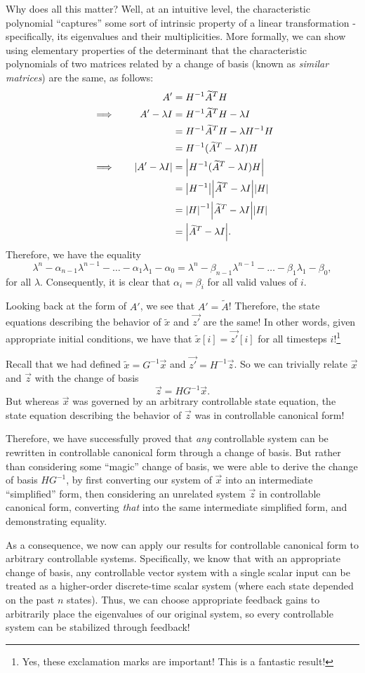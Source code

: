 \documentclass[letterpaper]{article}
\theoremstyle{remark}
\renewcommand{\tilde}[1]{\widetilde{#1}}
\newcommand{\eqn}[1]{\begin{alignat*}{2}#1\end{alignat*}}
\newcommand*{\thus}{&\implies\quad&}
\begin{document}
Why does all this matter? Well, at an intuitive level, the characteristic polynomial ``captures'' some sort of intrinsic property of a linear transformation - specifically, its eigenvalues and their multiplicities. More formally, we can show using elementary properties of the determinant that the characteristic polynomials of two matrices related by a change of basis (known as \emph{similar matrices}) are the same, as follows:
\eqn{
    && A' &= H^{-1}\tilde{A}^TH \\
    \thus A' - \lambda I &= H^{-1}\tilde{A}^TH - \lambda I \\
    &&&= H^{-1}\tilde{A}^TH - \lambda H^{-1}H \\
    &&&= H^{-1}(\tilde{A}^T - \lambda I)H \\
    \thus \abs{A' - \lambda I} &= \abs{H^{-1}(\tilde{A}^T - \lambda I)H} \\
    &&&= \abs{H^{-1}}\abs{\tilde{A}^T - \lambda I}\abs{H} \\
    &&&= \abs{H}^{-1}\abs{\tilde{A}^T - \lambda I}\abs{H} \\
    &&&= \abs{\tilde{A}^T - \lambda I}.
}
Therefore, we have the equality
\[
\lambda^n - \alpha_{n-1}\lambda^{n-1} - \ldots - \alpha_1\lambda_1 - \alpha_0 = \lambda^n - \beta_{n-1}\lambda^{n-1} - \ldots - \beta_1\lambda_1 - \beta_0,
\]
for all $\lambda$. Consequently, it is clear that $\alpha_i = \beta_i$ for all valid values of $i$.

Looking back at the form of $A'$, we see that $A' = \tilde{A}$! Therefore, the state equations describing the behavior of $\tilde{x}$ and $\vec{z'}$ are the same! In other words, given appropriate initial conditions, we have that $\tilde{x}[i] = \vec{z'}[i]$ for all timesteps $i$!\footnote{Yes, these exclamation marks are important! This is a fantastic result!}

Recall that we had defined $\tilde{x} = G^{-1}\vec{x}$ and $\vec{z'} = H^{-1}\vec{z}$. So we can trivially relate $\vec{x}$ and $\vec{z}$ with the change of basis
\[
    \vec{z} = HG^{-1}\vec{x}.
\]
But whereas $\vec{x}$ was governed by an arbitrary controllable state equation, the state equation describing the behavior of $\vec{z}$ was in controllable canonical form!

Therefore, we have successfully proved that \emph{any} controllable system can be rewritten in controllable canonical form through a change of basis. But rather than considering some ``magic'' change of basis, we were able to derive the change of basis $HG^{-1}$, by first converting our system of $\vec{x}$ into an intermediate ``simplified'' form, then considering an unrelated system $\vec{z}$ in controllable canonical form, converting \emph{that} into the same intermediate simplified form, and demonstrating equality.

As a consequence, we now can apply our results for controllable canonical form to arbitrary controllable systems. Specifically, we know that with an appropriate change of basis, any controllable vector system with a single scalar input can be treated as a higher-order discrete-time scalar system (where each state depended on the past $n$ states). Thus, we can choose appropriate feedback gains to arbitrarily place the eigenvalues of our original system, so every controllable system can be stabilized through feedback!
\end{document}
